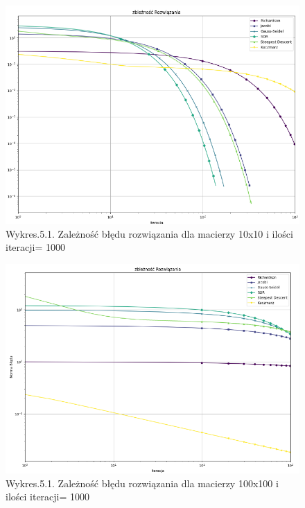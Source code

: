 \documentclass{article}
\begin{document}
\begin{figure}[H]
  \includegraphics[width=1.5\textwidth, center]{Rozco10.png}
  \centering
  \captionsetup[Tabela]{name=New Table Name}
  \caption*{Wykres.5.1. Zależność błędu rozwiązania dla macierzy 10x10 i ilości iteracji= 1000}
\end{figure}
\begin{figure}[H]
  \includegraphics[width=1.5\textwidth, center]{Rozco100.png}
  \centering
  \captionsetup[Tabela]{name=New Table Name}
  \caption*{Wykres.5.1. Zależność błędu rozwiązania dla macierzy 100x100 i ilości iteracji= 1000}
\end{figure}
\end{document}
